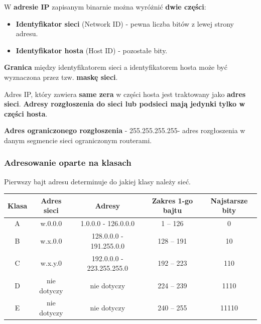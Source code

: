 \documentclass[12pt]{article}
\begin{document}
    \noindent W \textbf{adresie IP} zapisanym binarnie można wyróżnić \textbf{dwie części}:
    \begin{itemize}
        \item \textbf{Identyfikator sieci} (Network ID) - pewna liczba bitów z lewej strony adresu.
        \item \textbf{Identyfikator hosta} (Host ID) - pozostałe bity.
    \end{itemize}
    \textbf{Granica} między identyfikatorem sieci a identyfikatorem hosta może być wyznaczona przez
    tzw. \textbf{maskę sieci}.

    Adres IP, który zawiera \textbf{same zera} w części hosta jest traktowany jako \textbf{adres sieci}.
    \textbf{Adresy rozgłoszenia do sieci lub podsieci mają jedynki tylko w części hosta}.

    \textbf{Adres ograniczonego rozgłoszenia} - 255.255.255.255- adres rozgłoszenia
    w danym segmencie sieci ograniczonym routerami.\\

    \subsubsection{Adresowanie oparte na klasach}

    Pierwszy bajt adresu determinuje do jakiej klasy należy sieć.

    \begin{tabular}{|c|c|c|c|c|}
        \hline
        Klasa & Adres sieci & Adresy & Zakres 1-go bajtu & Najstarsze bity\\
        \hline
        A & w.0.0.0 & 1.0.0.0 - 126.0.0.0 & 1 – 126 & 0\\
        \hline
        B & w.x.0.0 & 128.0.0.0 - 191.255.0.0 & 128 – 191 & 10\\
        \hline
        C & w.x.y.0 & 192.0.0.0 - 223.255.255.0 & 192 – 223 & 110\\
        \hline
        D & nie dotyczy & nie dotyczy & 224 – 239 & 1110\\
        \hline
        E & nie dotyczy & nie dotyczy & 240 – 255 & 11110\\
        \hline
    \end{tabular}
\end{document}
